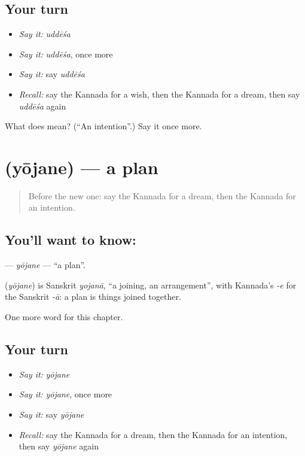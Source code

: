 \subsection*{Your turn}
\begin{itemize}
\raggedright
  \item \emph{Say it:} \emph{uddēśa}
  \item \emph{Say it:} \emph{uddēśa}, once more
  \item \emph{Say it:} say \emph{uddēśa}
  \item \emph{Recall:} say the Kannada for a wish, then the Kannada for a dream, then say \emph{uddēśa} again
\end{itemize}

\begin{tcolorbox}[breakable,colback=teal!4,colframe=teal!35!black,title={Before you move on}]
What does  mean? (\textquotedblleft{}An intention\textquotedblright{}.) Say it once more.
\end{tcolorbox}
\section[\texorpdfstring{\kn{ಯೋಜನೆ} (yōjane)}{ಯೋಜನೆ (yōjane)}]{ (yōjane) — a plan}

\label{lesson:KA-C114-yojane}



\begin{quote}
Before the new one: say the Kannada for a dream, then the Kannada for an intention.
\end{quote}

\subsection*{You'll want to know: }
\textbf{} — \emph{yōjane} — \textquotedblleft{}a plan\textquotedblright{}.

\begin{cousinweb}
\textbf{} (\emph{yōjane}) is Sanskrit \emph{yojanā}, \textquotedblleft{}a joining, an arrangement\textquotedblright{}, with Kannada's \emph{-e} for the Sanskrit \emph{-ā}: a plan is things joined together.
\end{cousinweb}

\begin{grammarlens}[title={What you've built}]
One more word for this chapter.
\end{grammarlens}

\subsection*{Your turn}
\begin{itemize}
\raggedright
  \item \emph{Say it:} \emph{yōjane}
  \item \emph{Say it:} \emph{yōjane}, once more
  \item \emph{Say it:} say \emph{yōjane}
  \item \emph{Recall:} say the Kannada for a dream, then the Kannada for an intention, then say \emph{yōjane} again
\end{itemize}


